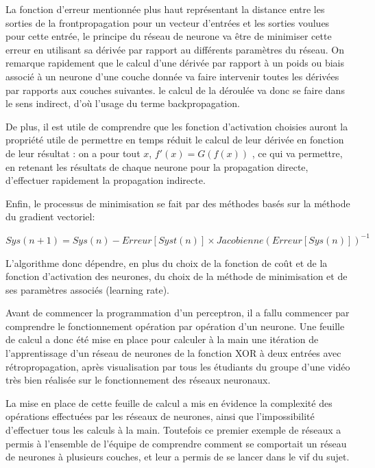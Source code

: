 \documentclass[
    10pt,
    a4paper,
    oneside,
    headinclude,footinclude,
    BCOR=5mm,
    captions=tableabove
]{scrartcl}
\begin{document}
 La fonction d'erreur mentionnée plus haut représentant la distance entre les sorties de la frontpropagation pour un vecteur d'entrées et les sorties voulues pour cette entrée, le principe du réseau de neurone va être de minimiser cette erreur en utilisant sa dérivée par rapport au différents paramètres du réseau. On remarque rapidement que le calcul d'une dérivée par rapport à un poids ou biais associé à un neurone d'une couche donnée va faire intervenir toutes les dérivées par rapports aux couches suivantes. le calcul de la déroulée va donc se faire dans le sens indirect, d'où l'usage du terme backpropagation.

De plus, il est utile de comprendre que les fonction d'activation choisies auront la propriété utile de permettre en temps réduit le calcul de leur dérivée en fonction de leur résultat : on a pour tout $x$, $f'(x)=G(f(x))$ , ce qui va permettre, en retenant les résultats de chaque neurone pour la propagation directe, d'effectuer rapidement la propagation indirecte. 

Enfin, le processus de minimisation se fait par des méthodes basés sur la méthode du gradient vectoriel:

 \hspace{4mm} $Sys(n+1) = Sys(n) - Erreur[Syst(n)] \times Jacobienne(Erreur[Sys(n)]) ^{-1} $   

L'algorithme donc dépendre, en plus du choix de la fonction de coût et de la fonction d'activation des neurones, du choix de la méthode de minimisation et de ses paramètres associés (learning rate).
\vspace{5mm}

Avant de commencer la programmation d'un perceptron, il a fallu commencer par comprendre le fonctionnement opération par opération d'un neurone. Une feuille de calcul a donc été mise en place pour calculer à la main une itération de l'apprentissage d'un réseau de neurones de la fonction XOR à deux entrées avec rétropropagation, après visualisation par tous les étudiants du groupe d'une vidéo très bien réalisée sur le fonctionnement des réseaux neuronaux.

La mise en place de cette feuille de calcul a mis en évidence la complexité des opérations effectuées par les réseaux de neurones, ainsi que l'impossibilité d'effectuer tous les calculs à la main. Toutefois ce premier exemple de réseaux a permis à l'ensemble de l'équipe de comprendre comment se comportait un réseau de neurones à plusieurs couches, et leur a permis de se lancer dans le vif du sujet. 
\vspace{30mm}
\end{document}
